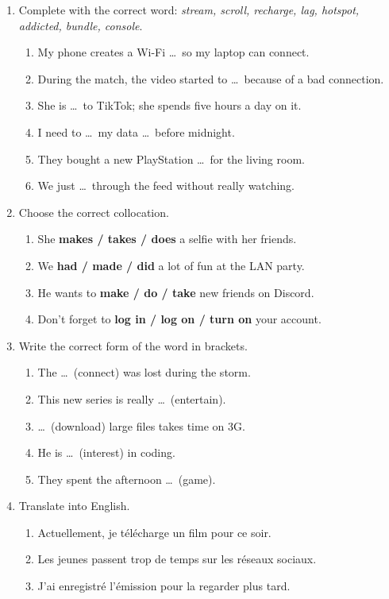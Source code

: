 \documentclass[11pt]{article}
\begin{document}
\begin{exercice}
\begin{enumerate}
\item Complete with the correct word: \emph{stream, scroll, recharge, lag, hotspot, addicted, bundle, console}.
\begin{enumerate}
\item My phone creates a Wi-Fi \ldots\ so my laptop can connect.
\item During the match, the video started to \ldots\ because of a bad connection.
\item She is \ldots\ to TikTok; she spends five hours a day on it.
\item I need to \ldots\ my data \ldots\ before midnight.
\item They bought a new PlayStation \ldots\ for the living room.
\item We just \ldots\ through the feed without really watching.
\end{enumerate}
\item Choose the correct collocation.
\begin{enumerate}
\item She \textbf{makes / takes / does} a selfie with her friends.
\item We \textbf{had / made / did} a lot of fun at the LAN party.
\item He wants to \textbf{make / do / take} new friends on Discord.
\item Don't forget to \textbf{log in / log on / turn on} your account.
\end{enumerate}
\item Write the correct form of the word in brackets.
\begin{enumerate}
\item The \ldots\ (connect) was lost during the storm.
\item This new series is really \ldots\ (entertain).
\item \ldots\ (download) large files takes time on 3G.
\item He is \ldots\ (interest) in coding.
\item They spent the afternoon \ldots\ (game).
\end{enumerate}
\item Translate into English.
\begin{enumerate}
\item Actuellement, je télécharge un film pour ce soir.
\item Les jeunes passent trop de temps sur les réseaux sociaux.
\item J'ai enregistré l'émission pour la regarder plus tard.
\end{enumerate}
\end{enumerate}
\end{exercice}
\end{document}
